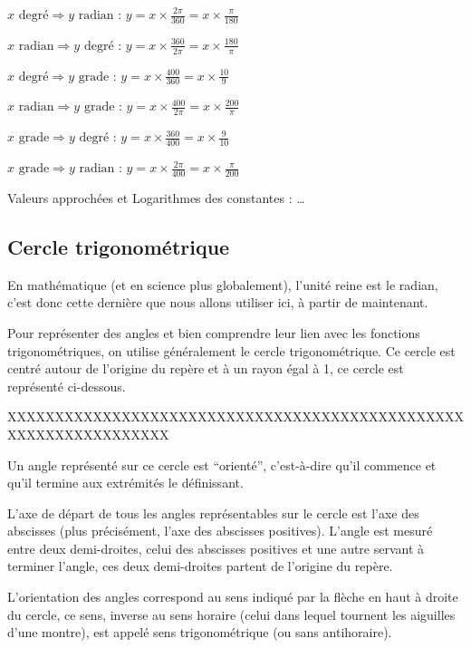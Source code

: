 \documentclass[a4paper]{article}
\begin{document}
				$x \text{ degré} \Rightarrow y \text{ radian : }	y = x \times \frac{2 \pi}{360} = x \times \frac{\pi}{180}$

				$x \text{ radian} \Rightarrow y \text{ degré : }	y = x \times \frac{360}{2 \pi} = x \times \frac{180}{\pi}$

				$x \text{ degré} \Rightarrow y \text{ grade : }	y = x \times \frac{400}{360} = x \times \frac{10}{9}$

				$x \text{ radian} \Rightarrow y \text{ grade : }	y = x \times \frac{400}{2 \pi} = x \times \frac{200}{\pi}$

				$x \text{ grade} \Rightarrow y \text{ degré : }	y = x \times \frac{360}{400} = x \times \frac{9}{10}$

				$x \text{ grade} \Rightarrow y \text{ radian : }	y = x \times \frac{2 \pi}{400} = x \times \frac{\pi}{200}$

				Valeurs approchées et Logarithmes des constantes : …

		\subsection{Cercle trigonométrique}

			En mathématique (et en science plus globalement), l'unité reine est le radian, c'est donc cette dernière que nous allons utiliser ici, à partir de maintenant.

			Pour représenter des angles et bien comprendre leur lien avec les fonctions trigonométriques, on utilise généralement le cercle trigonométrique. Ce cercle est centré autour de l'origine du repère et à un rayon égal à 1, ce cercle est représenté ci-dessous. 

			XXXXXXXXXXXXXXXXXXXXXXXXXXXXXXXXXXXXXXXXXXXXXXXXXXXXXXXXXXXXXXXXX

			Un angle représenté sur ce cercle est “orienté”, c'est-à-dire qu'il commence et qu'il termine aux extrémités le définissant.

			L'axe de départ de tous les angles représentables sur le cercle est l'axe des abscisses (plus précisément, l'axe des abscisses positives). L'angle est mesuré entre deux demi-droites, celui des abscisses positives et une autre servant à terminer l'angle, ces deux demi-droites partent de l'origine du repère.

			L'orientation des angles correspond au sens indiqué par la flèche en haut à droite du cercle, ce sens, inverse au sens horaire (celui dans lequel tournent les aiguilles d'une montre), est appelé sens trigonométrique (ou sans antihoraire).
\end{document}
